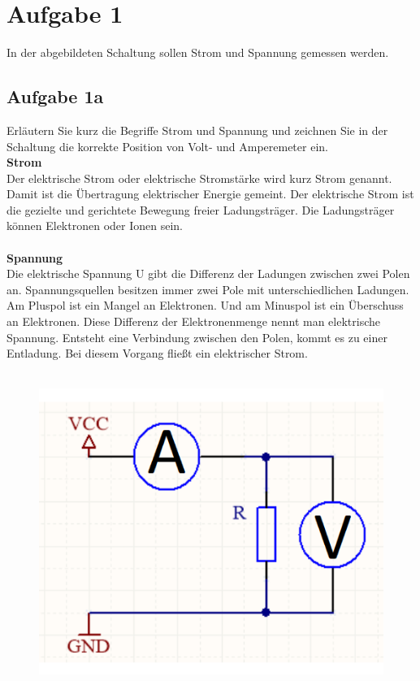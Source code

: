 \newpage
\section{Aufgabe 1}
	In der abgebildeten Schaltung sollen Strom und Spannung gemessen werden.\\
	\subsection{Aufgabe 1a}
		Erläutern Sie kurz die Begriffe Strom und Spannung und zeichnen Sie in der Schaltung die korrekte Position von Volt- und Amperemeter ein.\\
		\textbf{Strom}\\
		Der elektrische Strom oder elektrische Stromstärke wird kurz Strom genannt. Damit ist die Übertragung elektrischer Energie gemeint. Der elektrische Strom ist die gezielte und gerichtete Bewegung freier Ladungsträger. Die Ladungsträger können Elektronen oder Ionen sein.\\ \\
		\textbf{Spannung}\\
		Die elektrische Spannung U gibt die Differenz der Ladungen zwischen zwei Polen an. Spannungsquellen besitzen immer zwei Pole mit unterschiedlichen Ladungen. Am Pluspol ist ein Mangel an Elektronen. Und am Minuspol ist ein Überschuss an Elektronen. Diese Differenz der Elektronenmenge nennt man elektrische Spannung. Entsteht eine Verbindung zwischen den Polen, kommt es zu einer Entladung. Bei diesem Vorgang flie\ss{}t ein elektrischer Strom.\\ \\
		\begin{figure}[h]
			\centering
			\includegraphics[width=0.7\linewidth]{images/Strom_Spannung}
			\caption{}
			\label{fig:Strom_Spannung}
		\end{figure}
